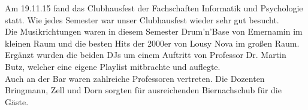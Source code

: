 Am 19.11.15 fand das Clubhausfest der Fachschaften Informatik und Psychologie statt. Wie jedes Semester war unser Clubhausfest wieder sehr gut besucht.\\
Die Musikrichtungen waren in diesem Semester Drum'n'Base von Emernamin im kleinen Raum und die besten Hits der 2000er von Lousy Nova im großen Raum. Ergänzt wurden die beiden DJs um einem Auftritt von Professor Dr. Martin Butz, welcher eine eigene Playlist mitbrachte und auflegte.\\
Auch an der Bar waren zahlreiche Professoren vertreten. Die Dozenten Bringmann, Zell und Dorn sorgten für ausreichenden Biernachschub für die Gäste.
